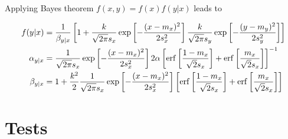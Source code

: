 \documentclass[10pt,a4paper]{article}
\begin{document}
Applying Bayes theorem $f(x,y)=f(x)f(y|x)$ leads to

\begin{align}
f(y|x)&=\frac{1}{\beta_{y|x}}\left[1+\frac{k}{\sqrt{2\pi}s_x}
\exp\left[-\frac{(x-m_x)^2}{2s_x^2}\right]\frac{k}{\sqrt{2\pi}s_y}
\exp\left[-\frac{(y-m_y)^2}{2s_y^2}\right]\right]\\
\alpha_{y|x}&=\frac{1}{\sqrt{2\pi}s_x}
\exp\left[-\frac{(x-m_x)^2}{2s_x^2}\right]
2\alpha\left[\erf\left[\frac{1-m_x}{\sqrt{2}s_x}\right]+
\erf\left[\frac{m_x}{\sqrt{2}s_x}\right]\right]^{-1}\\
\beta_{y|x}&=1+\frac{k^2}{2}\frac{1}{\sqrt{2\pi}s_x}
\exp\left[-\frac{(x-m_x)^2}{2s_x^2}\right]
\left[\erf\left[\frac{1-m_x}{\sqrt{2}s_x}\right]+
\erf\left[\frac{m_x}{\sqrt{2}s_x}\right]\right]
\end{align}



\section{Tests}
\end{document}
